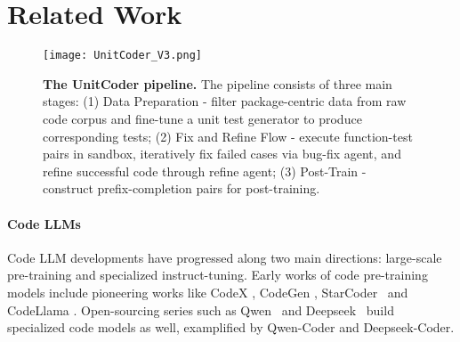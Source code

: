 \section{Related Work}
\begin{figure*}[h]
    \centering
    \texttt{[image: UnitCoder\_V3.png]}
    \caption{\textbf{The UnitCoder pipeline.} The pipeline consists of three main stages: (1) Data Preparation - filter package-centric data from raw code corpus and fine-tune a unit test generator to produce corresponding tests; (2) Fix and Refine Flow - execute function-test pairs in sandbox, iteratively fix failed cases via bug-fix agent, and refine successful code through refine agent; (3) Post-Train - construct prefix-completion pairs for post-training.}
    \label{fig:overall_framework}
\end{figure*}



\paragraph{Code LLMs}

Code LLM developments have progressed along two main directions: large-scale pre-training and specialized instruct-tuning.
Early works of code pre-training models include pioneering works like CodeX \cite{Chen2021EvaluatingLL}, CodeGen \cite{nijkamp2022codegen}, StarCoder~\cite{li2023starcoder} and CodeLlama \cite{Rozire2023CodeLO}.
Open-sourcing series such as Qwen~\cite{Bai2023QwenTR,Yang2024Qwen2TR} and Deepseek~\cite{deepseekai2024deepseekv2strongeconomicalefficient} build specialized code models as well, examplified by Qwen-Coder and Deepseek-Coder\cite{Hui2024Qwen25CoderTR, guo2024deepseekcoder}. 

